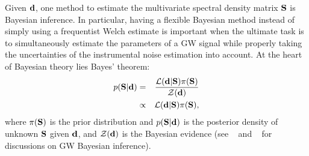 \documentclass[%
 reprint,
 amsmath,amssymb,
 aps,
]{revtex4-2}
\begin{document}
Given $\d$, one method to estimate the multivariate spectral density matrix $\S$ is Bayesian inference. In particular, having a flexible Bayesian method instead of simply using a frequentist Welch estimate is important when the ultimate task is to simultaneously estimate the parameters of a GW signal while properly taking the uncertainties of the instrumental noise estimation into account. At the heart of Bayesian theory lies Bayes' theorem: 
\begin{eqnarray}
    p(\S|\d) &=& \frac{\mathcal{L}(\d|\S)\pi(\S)}{\mathcal{Z}(\d)} \\
    &\propto& \mathcal{L}(\d|\S)\pi(\S) ,
\end{eqnarray}
where $\pi(\S)$ is the prior distribution and $p(\S|\d)$ is the posterior density of unknown $\S$ given $\d$, 
and $\mathcal{Z}(\d)$ is the Bayesian evidence (see ~\citet{thrane_talbot_bayesian_primer} and ~\citet{Christensen_PE_for_GW} for discussions on \ac{GW} Bayesian inference).


\end{document}
